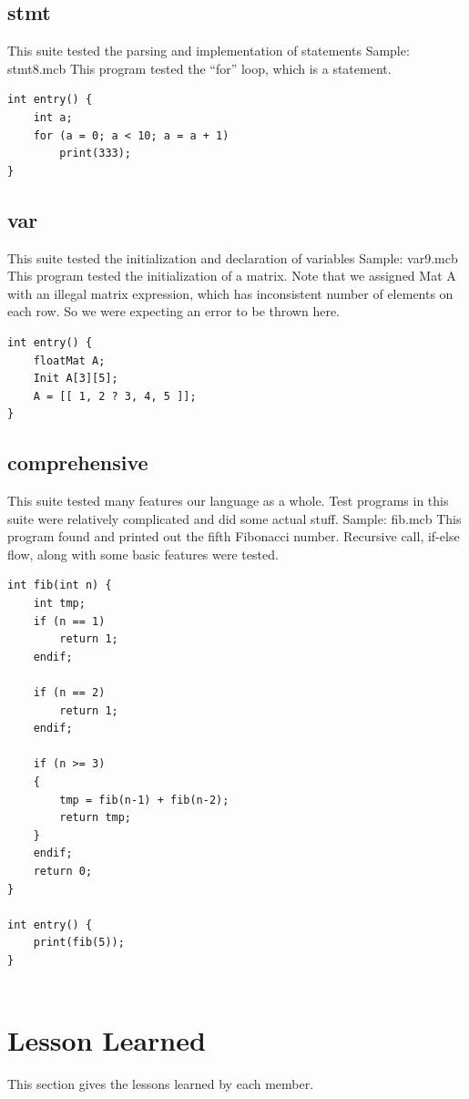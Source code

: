 \documentclass[12pt]{article} %
\begin{document}
\subsection{stmt}
This suite tested the parsing and implementation of statements
Sample: stmt8.mcb
This program tested the ``for'' loop, which is a statement. 
\begin{lstlisting}
int entry() {
    int a;
    for (a = 0; a < 10; a = a + 1)
        print(333);
}
\end{lstlisting}



\subsection{var}
This suite tested the initialization and declaration of variables
Sample: var9.mcb
This program tested the initialization of a matrix. Note that we assigned Mat A with an illegal matrix expression, which has inconsistent number of elements on each row. So we were expecting an error to be thrown here. 
\begin{lstlisting}
int entry() {
    floatMat A;
    Init A[3][5];
    A = [[ 1, 2 ? 3, 4, 5 ]];
}
\end{lstlisting}

\subsection{comprehensive}
This suite tested many features our language as a whole. Test programs in this suite were relatively complicated and did some actual stuff. 
Sample: fib.mcb
This program found and printed out the fifth Fibonacci number. Recursive call, if-else flow, along with some basic features were tested. 
\begin{lstlisting}
int fib(int n) {
    int tmp;
    if (n == 1)
        return 1;
    endif;
    
    if (n == 2)
        return 1;
    endif;
    
    if (n >= 3)
    {
        tmp = fib(n-1) + fib(n-2);
        return tmp;
    }
    endif;    
    return 0;
}

int entry() {
    print(fib(5));
}


\end{lstlisting}


\section{Lesson Learned}
This section gives the lessons learned by each member.
\end{document}
